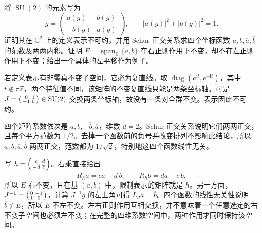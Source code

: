\begin{exercise}\label{g1:ex:su2-regular-row-subspace}
	将 \(\operatorname{SU}(2)\) 的元素写为
	\[
		g=\begin{pmatrix}a(g)&b(g)\\-\overline{b(g)}&\overline{a(g)}\end{pmatrix},
		\qquad |a(g)|^2+|b(g)|^2=1.
	\]
	证明其在 \(\mathbb C^2\) 上的定义表示不可约，并用 Schur 正交关系求四个坐标函数 \(a,b,\overline a,\overline b\) 的范数及两两内积。证明 \(E=\operatorname{span}_{\mathbb C}\{a,b\}\) 在右正则作用下不变，却不在左正则作用下不变；给出一个具体的左平移作为例子。
\end{exercise}
\begin{solution}
	若定义表示有非零真不变子空间，它必为复直线。取 \(\operatorname{diag}(e^{\mathrm{i}t},e^{-\mathrm{i}t})\)，其中 \(t\notin\pi\mathbb Z\)，两个特征值不同，该矩阵的不变复直线只能是两条坐标轴。可是 \(J=\begin{psmallmatrix}0&1\\-1&0\end{psmallmatrix}\in\operatorname{SU}(2)\) 交换两条坐标轴，故没有一条对全群不变。表示因此不可约。

	四个矩阵系数依次是 \(a,b,-\overline b,\overline a\)，维数 \(d=2\)。Schur 正交关系说明它们两两正交，且每个平方范数为 \(1/2\)。去掉一个函数前的负号并改变排列不影响此结论，所以 \(a,b,\overline a,\overline b\) 两两正交，范数都为 \(1/\sqrt2\)，特别地这四个函数线性无关。

	写 \(h=\begin{psmallmatrix}c&d\\-\overline d&\overline c\end{psmallmatrix}\)。右乘直接给出
	\[
		R_ha=ca-\overline d\,b,\qquad
		R_hb=da+\overline c\,b,
	\]
	所以 \(E\) 右不变，且在基 \((a,b)\) 中，限制表示的矩阵就是 \(h\)。另一方面，\(J^{-1}=\begin{psmallmatrix}0&-1\\1&0\end{psmallmatrix}\)，计算 \(J^{-1}g\) 的左上角可得 \(L_Ja=\overline b\)。四个函数的线性无关性说明 \(\overline b\notin E\)，所以 \(E\) 不左不变。左右正则作用互相交换，并不意味着一个任意选定的右不变子空间也必须左不变；在完整的四维系数空间中，两种作用才同时保持该空间。
\end{solution}

